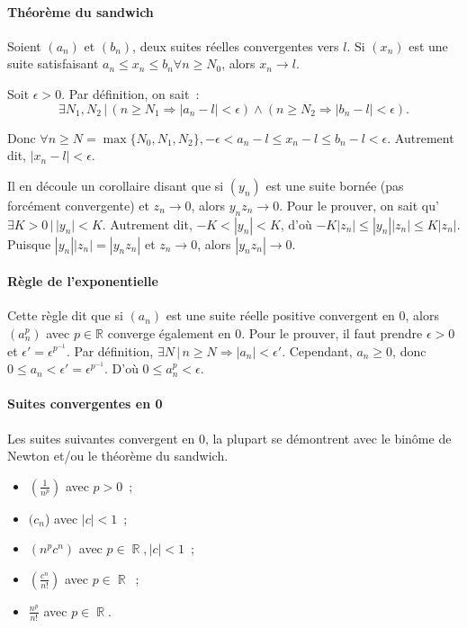 \documentclass{article}
\DeclareMathOperator{\R}{\mathbb R}
\theoremstyle{definition}
\theoremstyle{remark}
\begin{document}
			\paragraph{Théorème du sandwich} Soient $(a_n)$ et $(b_n)$, deux suites réelles convergentes vers $l$. Si $(x_n)$ est une suite satisfaisant
			$a_n \leq x_n \leq b_n \forall n \geq N_0$, alors $x_n \to l$.

			Soit $\epsilon > 0$. Par définition, on sait~:
			\[\exists N_1, N_2 \, | \, (n \geq N_1 \Rightarrow |a_n - l| < \epsilon) \land (n \geq N_2 \Rightarrow |b_n - l| < \epsilon).\]
			
			Donc $\forall n \geq N = \max \{N_0, N_1, N_2\}, -\epsilon < a_n - l \leq x_n - l \leq b_n - l < \epsilon$. Autrement dit, $|x_n - l| < \epsilon$.

			Il en découle un corollaire disant que si $(y_n)$ est une suite bornée (pas forcément convergente) et $z_n \to 0$, alors $y_nz_n \to 0$. Pour le prouver,
			on sait qu'$\exists K > 0 \, | \, |y_n| < K$. Autrement dit, $-K < |y_n| < K$, d'où $-K|z_n| \leq |y_n||z_n| \leq K|z_n|$. Puisque $|y_n||z_n| = |y_nz_n|$ et
			$z_n \to 0$, alors $|y_nz_n| \to 0$.

			\paragraph{Règle de l'exponentielle} Cette règle dit que si $(a_n)$ est une suite réelle positive convergent en 0, alors $(a_n^p)$ avec $p \in \mathbb R$
			converge également en 0. Pour le prouver, il faut prendre $\epsilon > 0$ et $\epsilon' = \epsilon^{p^{-1}}$. Par définition,
			$\exists N \, | \, n \geq N \Rightarrow |a_n| < \epsilon'$. Cependant, $a_n \geq 0$, donc $0 \leq a_n < \epsilon' = \epsilon^{p^{-1}}$. D'où
			$0 \leq a_n^p < \epsilon$.

			\paragraph{Suites convergentes en 0} Les suites suivantes convergent en 0, la plupart se démontrent avec le binôme de Newton et/ou le théorème du sandwich.

			\begin{itemize}
				\item $(\frac {1}{n^p})$ avec $p > 0$~;
				\item $(c_n$) avec $|c| < 1$~;
				\item $(n^pc^n)$ avec $p \in \R, |c| < 1$~;
				\item $(\frac {c^n}{n!})$ avec $p \in \R$~;
				\item $\frac {n^p}{n!}$ avec $p \in \R$.
			\end{itemize}
\end{document}
